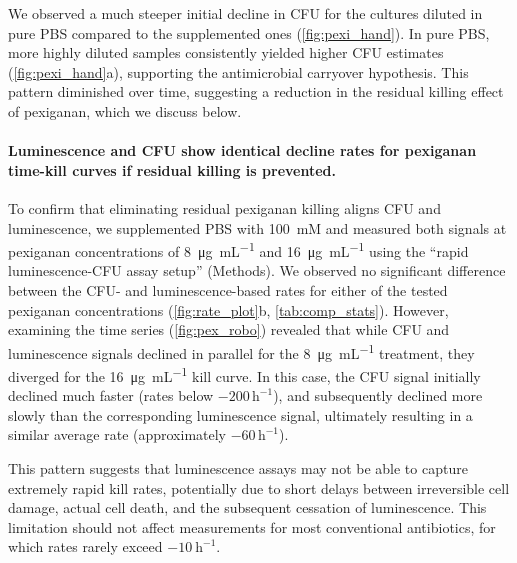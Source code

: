 We observed a much steeper initial decline in CFU for the cultures diluted in pure PBS compared to the supplemented ones (\autoref{fig:pexi_hand}).
In pure PBS, more highly diluted samples consistently yielded higher CFU estimates (\autoref{fig:pexi_hand}a), supporting the antimicrobial carryover hypothesis.
This pattern diminished over time, suggesting a reduction in the residual killing effect of pexiganan, which we discuss below.

\paragraph{Luminescence and CFU show identical decline rates for pexiganan time-kill curves if residual killing is prevented.}
To confirm that eliminating residual pexiganan killing aligns CFU and luminescence, we supplemented PBS with \SI{100}{\milli M}  and measured both signals at pexiganan concentrations of \SI{8}{\micro\gram\per\milli\liter}
and \SI{16}{\micro\gram\per\milli\liter} using the ``rapid luminescence-CFU assay setup'' (Methods).
We observed no significant difference between the CFU- and luminescence-based rates for either of the tested pexiganan concentrations (\autoref{fig:rate_plot}b, \autoref{tab:comp_stats}).
However, examining the time series (\autoref{fig:pex_robo}) revealed that while CFU and luminescence signals declined in parallel for the \SI{8}{\micro\gram\per\milli\liter} treatment, they diverged for the \SI{16}{\micro\gram\per\milli\liter} kill curve.
In this case, the CFU signal initially declined much faster (rates below \(-200\,\mathrm{h}^{-1}\)), and subsequently declined more slowly than the corresponding luminescence signal, ultimately resulting in a similar average rate (approximately \(-60\,\mathrm{h}^{-1}\)).

This pattern suggests that luminescence assays may not be able to capture extremely rapid kill rates, potentially due to short delays between irreversible cell damage, actual cell death, and the subsequent cessation of luminescence.
This limitation should not affect measurements for most conventional antibiotics, for which rates rarely exceed $-10\ \mathrm{h}^{-1}$.


